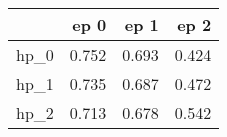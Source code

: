 \begin{tabular}{lrrr}
\toprule
{} &   ep 0 &   ep 1 &   ep 2 \\
\midrule
hp\_0 &  0.752 &  0.693 &  0.424 \\
hp\_1 &  0.735 &  0.687 &  0.472 \\
hp\_2 &  0.713 &  0.678 &  0.542 \\
\bottomrule
\end{tabular}
